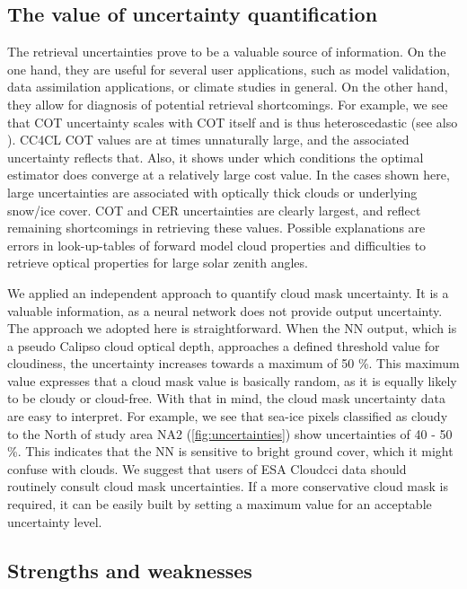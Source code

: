 \subsection{The value of uncertainty quantification}

The retrieval uncertainties prove to be a valuable source of information. On the one hand, they are useful for several user applications, such as model validation, data assimilation applications, or climate studies in general. On the other hand, they allow for diagnosis of potential retrieval shortcomings. For example, we see that COT uncertainty scales with COT itself and is thus heteroscedastic (see also \citet{Poulsen12}). CC4CL COT values are at times unnaturally large, and the associated uncertainty reflects that. Also, it shows under which conditions the optimal estimator does converge at a relatively large cost value. In the cases shown here, large uncertainties are associated with optically thick clouds or underlying snow/ice cover. COT and CER uncertainties are clearly largest, and reflect remaining shortcomings in retrieving these values. Possible explanations are errors in look-up-tables of forward model cloud properties and difficulties to retrieve optical properties for large solar zenith angles.

We applied an independent approach to quantify cloud mask uncertainty. It is a valuable information, as a neural network does not provide output uncertainty. The approach we adopted here is straightforward. When the NN output, which is a pseudo Calipso cloud optical depth, approaches a defined threshold value for cloudiness, the uncertainty increases towards a maximum of 50 \%. This maximum value expresses that a cloud mask value is basically random, as it is equally likely to be cloudy or cloud-free. With that in mind, the cloud mask uncertainty data are easy to interpret. For example, we see that sea-ice pixels classified as cloudy to the North of study area NA2 (\cref{fig:uncertainties}) show uncertainties of 40 - 50 \%. This indicates that the NN is sensitive to bright ground cover, which it might confuse with clouds. We suggest that users of ESA Cloud\textunderscore cci data should routinely consult cloud mask uncertainties. If a more conservative cloud mask is required, it can be easily built by setting a maximum value for an acceptable uncertainty level.

\subsection{Strengths and weaknesses}

